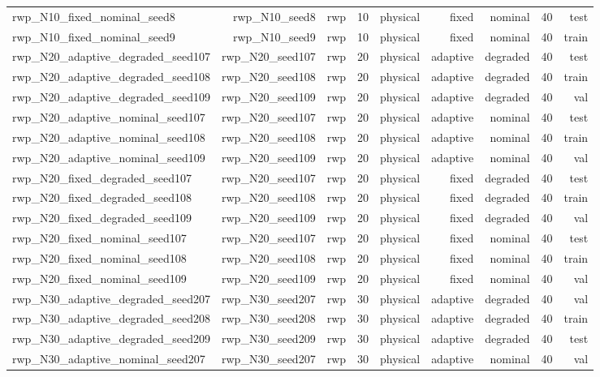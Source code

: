 \begin{tabular}{lrrrrrrrr}
rwp\_N10\_fixed\_nominal\_seed8 & rwp\_N10\_seed8 & rwp & 10 & physical & fixed & nominal & 40 & test \\
rwp\_N10\_fixed\_nominal\_seed9 & rwp\_N10\_seed9 & rwp & 10 & physical & fixed & nominal & 40 & train \\
rwp\_N20\_adaptive\_degraded\_seed107 & rwp\_N20\_seed107 & rwp & 20 & physical & adaptive & degraded & 40 & test \\
rwp\_N20\_adaptive\_degraded\_seed108 & rwp\_N20\_seed108 & rwp & 20 & physical & adaptive & degraded & 40 & train \\
rwp\_N20\_adaptive\_degraded\_seed109 & rwp\_N20\_seed109 & rwp & 20 & physical & adaptive & degraded & 40 & val \\
rwp\_N20\_adaptive\_nominal\_seed107 & rwp\_N20\_seed107 & rwp & 20 & physical & adaptive & nominal & 40 & test \\
rwp\_N20\_adaptive\_nominal\_seed108 & rwp\_N20\_seed108 & rwp & 20 & physical & adaptive & nominal & 40 & train \\
rwp\_N20\_adaptive\_nominal\_seed109 & rwp\_N20\_seed109 & rwp & 20 & physical & adaptive & nominal & 40 & val \\
rwp\_N20\_fixed\_degraded\_seed107 & rwp\_N20\_seed107 & rwp & 20 & physical & fixed & degraded & 40 & test \\
rwp\_N20\_fixed\_degraded\_seed108 & rwp\_N20\_seed108 & rwp & 20 & physical & fixed & degraded & 40 & train \\
rwp\_N20\_fixed\_degraded\_seed109 & rwp\_N20\_seed109 & rwp & 20 & physical & fixed & degraded & 40 & val \\
rwp\_N20\_fixed\_nominal\_seed107 & rwp\_N20\_seed107 & rwp & 20 & physical & fixed & nominal & 40 & test \\
rwp\_N20\_fixed\_nominal\_seed108 & rwp\_N20\_seed108 & rwp & 20 & physical & fixed & nominal & 40 & train \\
rwp\_N20\_fixed\_nominal\_seed109 & rwp\_N20\_seed109 & rwp & 20 & physical & fixed & nominal & 40 & val \\
rwp\_N30\_adaptive\_degraded\_seed207 & rwp\_N30\_seed207 & rwp & 30 & physical & adaptive & degraded & 40 & val \\
rwp\_N30\_adaptive\_degraded\_seed208 & rwp\_N30\_seed208 & rwp & 30 & physical & adaptive & degraded & 40 & train \\
rwp\_N30\_adaptive\_degraded\_seed209 & rwp\_N30\_seed209 & rwp & 30 & physical & adaptive & degraded & 40 & test \\
rwp\_N30\_adaptive\_nominal\_seed207 & rwp\_N30\_seed207 & rwp & 30 & physical & adaptive & nominal & 40 & val \\

\end{tabular}
